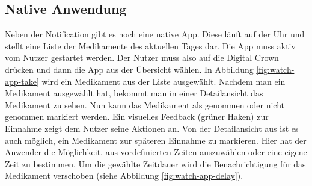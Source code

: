 \subsection{Native Anwendung}
Neben der Notification gibt es noch eine native App. Diese läuft auf der Uhr und stellt eine Liste der Medikamente des aktuellen Tages dar. Die App muss aktiv vom Nutzer gestartet werden. Der Nutzer muss also auf die Digital Crown drücken und dann die App aus der Übersicht wählen. In Abbildung \ref{fig:watch-app-take} wird ein Medikament aus der Liste ausgewählt. Nachdem man ein Medikament ausgewählt hat, bekommt man in einer Detailansicht das Medikament zu sehen. Nun kann das Medikament als genommen oder nicht genommen markiert werden. Ein visuelles Feedback (grüner Haken) zur Einnahme zeigt dem Nutzer seine Aktionen an. Von der Detailansicht aus ist es auch möglich, ein Medikament zur späteren Einnahme zu markieren. Hier hat der Anwender die Möglichkeit, aus vordefinierten Zeiten auszuwählen oder eine eigene Zeit zu bestimmen. Um die gewählte Zeitdauer wird die Benachrichtigung für das Medikament verschoben (siehe Abbildung \ref{fig:watch-app-delay}).

